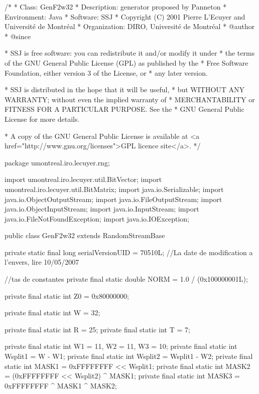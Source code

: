 \begin{code}
\begin{hide}
/*
 * Class:        GenF2w32
 * Description:  generator proposed by Panneton
 * Environment:  Java
 * Software:     SSJ 
 * Copyright (C) 2001  Pierre L'Ecuyer and Université de Montréal
 * Organization: DIRO, Université de Montréal
 * @author       
 * @since

 * SSJ is free software: you can redistribute it and/or modify it under
 * the terms of the GNU General Public License (GPL) as published by the
 * Free Software Foundation, either version 3 of the License, or
 * any later version.

 * SSJ is distributed in the hope that it will be useful,
 * but WITHOUT ANY WARRANTY; without even the implied warranty of
 * MERCHANTABILITY or FITNESS FOR A PARTICULAR PURPOSE.  See the
 * GNU General Public License for more details.

 * A copy of the GNU General Public License is available at
   <a href="http://www.gnu.org/licenses">GPL licence site</a>.
 */
\end{hide}
package umontreal.iro.lecuyer.rng;\begin{hide}

import umontreal.iro.lecuyer.util.BitVector;
import umontreal.iro.lecuyer.util.BitMatrix;
import java.io.Serializable;
import java.io.ObjectOutputStream;
import java.io.FileOutputStream;
import java.io.ObjectInputStream;
import java.io.InputStream;
import java.io.FileNotFoundException;
import java.io.IOException;\end{hide}

public class GenF2w32 extends RandomStreamBase \begin{hide} {

   private static final long serialVersionUID = 70510L;
   //La date de modification a l'envers, lire 10/05/2007

   //tas de constantes
   private final static double NORM = 1.0 / (0x100000001L);

   private final static int Z0 = 0x80000000;

   private final static int W = 32;

   private final static int R = 25;
   private final static int T = 7;

   private final static int W1 = 11, W2 = 11, W3 = 10;
   private final static int Wsplit1 = W - W1;
   private final static int Wsplit2 = Wsplit1 - W2;
   private final static int MASK1 = 0xFFFFFFFF << Wsplit1;
   private final static int MASK2 = (0xFFFFFFFF << Wsplit2) ^ MASK1;
   private final static int MASK3 = 0xFFFFFFFF ^ MASK1 ^ MASK2;

}
\end{hide}
\end{code}
